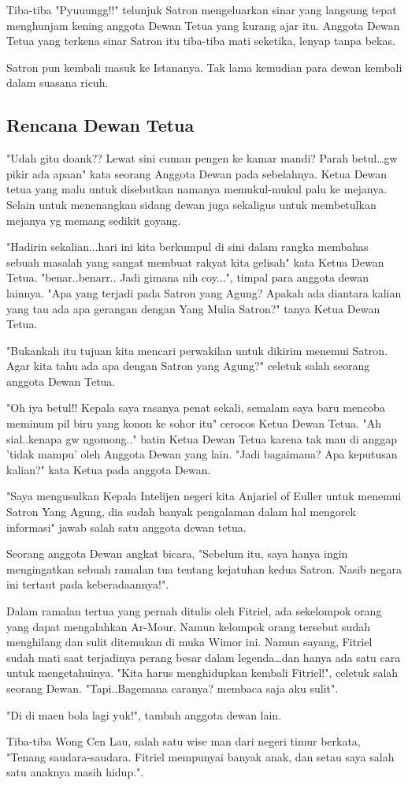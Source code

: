 Tiba-tiba "Pyuuungg!!" telunjuk Satron mengeluarkan sinar yang 
langsung tepat menghunjam kening anggota Dewan Tetua yang kurang 
ajar itu.
Anggota Dewan Tetua yang terkena sinar Satron itu tiba-tiba mati 
seketika, lenyap tanpa bekas.

Satron pun kembali masuk ke Istananya. Tak lama kemudian para dewan 
kembali dalam suasana ricuh.

\subsection{Rencana Dewan Tetua}
"Udah gitu doank?? Lewat sini cuman pengen ke kamar mandi? Parah 
betul\ldots gw pikir ada apaan" kata seorang Anggota Dewan pada 
sebelahnya.
Ketua Dewan tetua yang malu untuk disebutkan namanya memukul-mukul 
palu ke mejanya. Selain untuk menenangkan sidang dewan juga 
sekaligus untuk membetulkan mejanya yg memang sedikit goyang.

"Hadirin sekalian...hari ini kita berkumpul di sini dalam rangka 
membahas sebuah masalah yang sangat membuat rakyat kita gelisah" 
kata Ketua Dewan Tetua.
"benar..benarr.. Jadi gimana nih coy...", timpal para anggota dewan 
lainnya.
"Apa yang terjadi pada Satron yang Agung? Apakah ada diantara kalian 
yang tau ada apa gerangan dengan Yang Mulia Satron?" tanya Ketua 
Dewan Tetua.

"Bukankah itu tujuan kita mencari perwakilan untuk dikirim menemui 
Satron. Agar kita tahu ada apa dengan Satron yang Agung?" 
celetuk salah seorang anggota Dewan Tetua. 

"Oh iya betul!! Kepala saya rasanya penat sekali, semalam saya baru 
mencoba meminum pil biru yang konon ke sohor itu" cerocos 
Ketua Dewan Tetua.
"Ah sial..kenapa gw ngomong.." batin Ketua Dewan Tetua karena tak mau 
di anggap 'tidak mampu' oleh Anggota Dewan yang lain. 
"Jadi bagaimana? Apa keputusan kalian?" kata Ketua pada anggota Dewan.

"Saya mengusulkan Kepala Intelijen negeri kita Anjariel of Euller 
untuk menemui Satron Yang Agung, dia sudah banyak pengalaman dalam hal 
mengorek informasi" jawab salah satu anggota dewan tetua.

Seorang anggota Dewan angkat bicara, "Sebelum itu, saya hanya ingin 
mengingatkan sebuah ramalan tua tentang kejatuhan kedua Satron. 
Nasib negara ini tertaut pada keberadaannya!".

Dalam ramalan tertua yang pernah ditulis oleh Fitriel, ada sekelompok 
orang yang dapat mengalahkan Ar-Mour. 
Namun kelompok orang tersebut sudah menghilang dan sulit ditemukan di 
muka Wimor ini.
Namun sayang, Fitriel sudah mati saat terjadinya perang besar dalam 
legenda\ldots dan hanya ada satu cara untuk mengetahuinya. 
"Kita harus menghidupkan kembali Fitriel!", celetuk salah seorang Dewan. 
"Tapi..Bagemana caranya? membaca saja aku sulit".

"Di di maen bola lagi yuk!", tambah anggota dewan lain. 

Tiba-tiba Wong Cen Lau, salah satu wise man dari negeri timur berkata, 
"Tenang saudara-saudara. Fitriel mempunyai banyak anak, dan setau saya 
salah satu anaknya masih hidup.".
